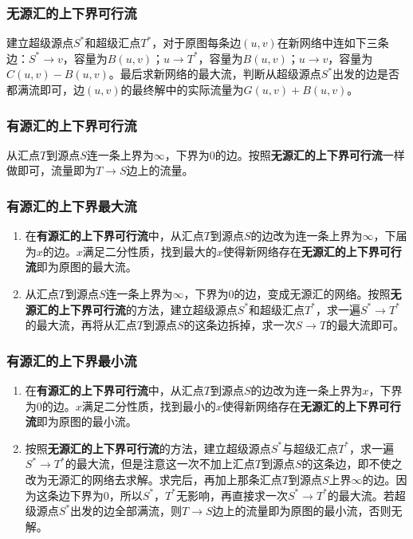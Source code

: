 \documentclass[landscape,a4paper]{article}
\begin{document}
\begin{spacing}{0.3}
\begin{multicols}{3}
\subsubsection{无源汇的上下界可行流}

建立超级源点$S^*$和超级汇点$T^*$，对于原图每条边$(u,v)$在新网络中连如下三条边：$S^* \rightarrow v$，容量为$B(u,v)$；$u \rightarrow T^*$，容量为$B(u,v)$；$u \rightarrow v$，容量为$C(u,v) - B(u,v)$。最后求新网络的最大流，判断从超级源点$S^*$出发的边是否都满流即可，边$(u,v)$的最终解中的实际流量为$G(u,v)+B(u,v)$。

\subsubsection{有源汇的上下界可行流}

从汇点$T$到源点$S$连一条上界为$\infty$，下界为$0$的边。按照\textbf{无源汇的上下界可行流}一样做即可，流量即为$T \rightarrow S$边上的流量。

\subsubsection{有源汇的上下界最大流}

\begin{enumerate}
	\item 在\textbf{有源汇的上下界可行流}中，从汇点$T$到源点$S$的边改为连一条上界为$\infty$，下届为$x$的边。$x$满足二分性质，找到最大的$x$使得新网络存在\textbf{无源汇的上下界可行流}即为原图的最大流。
	\item 从汇点$T$到源点$S$连一条上界为$\infty$，下界为$0$的边，变成无源汇的网络。按照\textbf{无源汇的上下界可行流}的方法，建立超级源点$S^*$和超级汇点$T^*$，求一遍$S^* \rightarrow T^*$的最大流，再将从汇点$T$到源点$S$的这条边拆掉，求一次$S \rightarrow T$的最大流即可。
\end{enumerate}

\subsubsection{有源汇的上下界最小流}

\begin{enumerate}
	\item 在\textbf{有源汇的上下界可行流}中，从汇点$T$到源点$S$的边改为连一条上界为$x$，下界为$0$的边。$x$满足二分性质，找到最小的$x$使得新网络存在\textbf{无源汇的上下界可行流}即为原图的最小流。
	\item 按照\textbf{无源汇的上下界可行流}的方法，建立超级源点$S^*$与超级汇点$T^*$，求一遍$S^* \rightarrow T^*$的最大流，但是注意这一次不加上汇点$T$到源点$S$的这条边，即不使之改为无源汇的网络去求解。求完后，再加上那条汇点$T$到源点$S$上界$\infty$的边。因为这条边下界为$0$，所以$S^*$，$T^*$无影响，再直接求一次$S^* \rightarrow T^*$的最大流。若超级源点$S^*$出发的边全部满流，则$T \rightarrow S$边上的流量即为原图的最小流，否则无解。
\end{enumerate}


\end{multicols}
\end{spacing}
\end{document}

